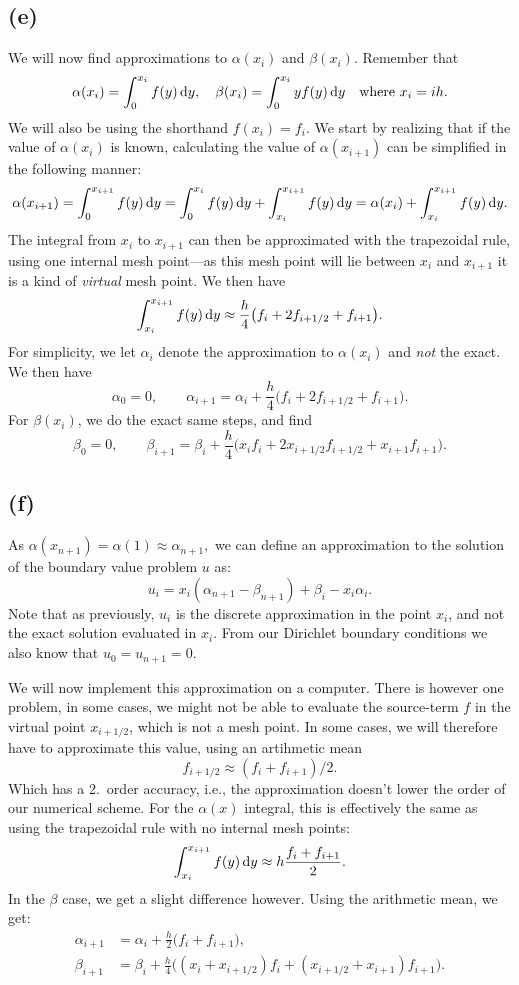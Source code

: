 \documentclass[a4paper, 11pt, notitlepage, english]{article}
\renewcommand{\d}{{\rm d}}
\begin{document}
\subsection*{(e)}
We will now find approximations to $\alpha(x_i)$ and $\beta(x_i)$. Remember that 
$$\alpha(x_i) = \int_0^{x_i} f(y) \, \d y, \quad \beta(x_i) = \int_0^{x_i} y f(y) \, \d y \quad \mbox {where } x_i = ih.$$
We will also be using the shorthand $f(x_i) = f_i$. We start by realizing that if the value of $\alpha(x_i)$ is known, calculating the value of $\alpha(x_{i+1})$ can be simplified in the following manner:
$$\alpha(x_{i+1}) = \int_0^{x_{i+1}} f(y) \, \d y = \int_0^{x_i}f(y) \, \d y + \int_{x_i}^{x_{i+1}}f(y)\, \d y = \alpha(x_i) + \int_{x_i}^{x_{i+1}}f(y)\, \d y.$$
The integral from $x_i$ to $x_{i+1}$ can then be approximated with the trapezoidal rule, using one internal mesh point---as this mesh point will lie between $x_i$ and $x_{i+1}$ it is a kind of \emph{virtual} mesh point. We then have
$$\int_{x_i}^{x_{i+1}}f(y)\, \d y \approx \frac{h}{4}\big(f_i + 2f_{i+1/2} + f_{i+1}\big).$$
For simplicity, we let $\alpha_i$ denote the approximation to $\alpha(x_i)$ and \emph{not} the exact. We then have
$$\alpha_0 = 0, \qquad \alpha_{i+1} = \alpha_i + \frac{h}{4}\big(f_i + 2f_{i+1/2} + f_{i+1}\big).$$
For $\beta(x_i)$, we do the exact same steps, and find
$$\beta_0 = 0, \qquad \beta_{i+1} = \beta_i + \frac{h}{4}\big(x_if_i + 2x_{i+1/2}f_{i+1/2} + x_{i+1}f_{i+1}\big).$$

\subsection*{(f)}
As $\alpha(x_{n+1}) = \alpha(1) \approx \alpha_{n+1},$ we can define an approximation to the solution of the boundary value problem $u$ as:
$$u_i = x_i(\alpha_{n+1} - \beta_{n+1}) + \beta_i - x_i\alpha_i.$$
Note that as previously, $u_i$ is the discrete approximation in the point $x_i$, and not the exact solution evaluated in $x_i$. From our Dirichlet boundary conditions we also know that
$u_0 = u_{n+1} = 0.$

We will now implement this approximation on a computer. There is however one problem, in some cases, we might not be able to evaluate the source-term $f$ in the virtual point $x_{i+1/2}$, which is not a mesh point. In some cases, we will therefore have to approximate this value, using an artihmetic mean
$$f_{i+1/2} \approx (f_i + f_{i+1})/2.$$
Which has a 2.\ order accuracy, i.e., the approximation doesn't lower the order of our numerical scheme. For the $\alpha(x)$ integral, this is effectively the same as using the trapezoidal rule with no internal mesh points:
$$\int_{x_i}^{x_{i+1}} f(y)\, \d y \approx h \frac{f_i + f_{i+1}}{2}.$$In the $\beta$ case, we get a slight difference however. Using the arithmetic mean, we get:
\begin{align*}
\alpha_{i+1} &= \alpha_i + \frac{h}{2}\big(f_i + f_{i+1}), \\[0.2cm]
\beta_{i+1} &= \beta_i + \frac{h}{4}\big((x_i + x_{i+1/2})f_i + (x_{i+1/2} +x_{i+1})f_{i+1}\big).
\end{align*}
 
\end{document}
